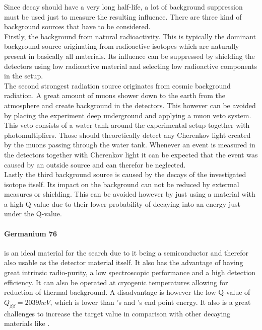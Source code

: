 Since \onbb decay should have a very long half-life, a lot of background suppression must be used just to measure the resulting influence.
There are three kind of background sources that have to be considered.
\\

Firstly, the background from natural radioactivity.
This is typically the dominant background source originating from radioactive isotopes which are naturally present in basically all materials.
Its influence can be suppressed by shielding the detectors using low radioactive material and selecting low radioactive components in the setup. 
\\

The second strongest radiation source originates from cosmic background radiation.
A great amount of muons shower down to the earth from the atmosphere and create background in the detectors.
This however can be avoided by placing the experiment deep underground and applying a muon veto system.
This veto consists of a water tank around the experimental setup together with photomultipliers.
Those should theoretically detect any Cherenkov light created by the muons passing through the water tank.
Whenever an event is measured in the detectors together with Cherenkov light it can be expected that the event was caused by an outside source and can therefor be neglected. 
\\

Lastly the third  background source is caused by the \twonu decays of the investigated isotope itself.
Its impact on the background can not be reduced by extermal measures or shielding.
This can be avoided however by just using a material with a high Q-value due to their lower probability of decaying into an energy just under the Q-value. 
\\

\paragraph{Germanium 76}

 is an ideal material for the \onbb search due to it being a semiconductor and therefor also usable as the detector material itself.
It also has the advantage of having great intrinsic radio-purity, a low spectroscopic performance and a high detection efficiency.
It can also be operated at cryogenic temperatures allowing for reduction of thermal background.
A disadvantage is however the low Q-value of $Q_{\beta\beta} = 2039\unit{keV}$, which is lower than 's and 's end point energy.
It also is a great challenges to increase the target value in comparison with other \twonu decaying materials like .
\\

